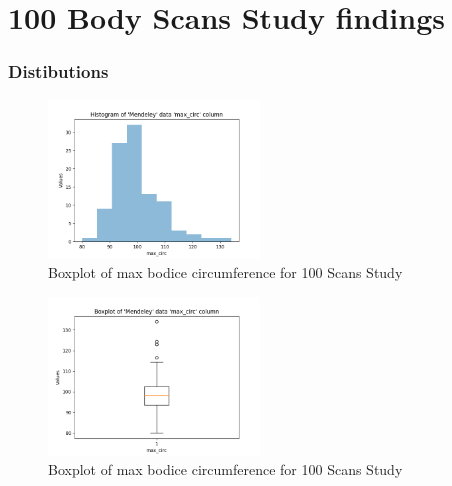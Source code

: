 \section{100 Body Scans Study findings}
\subsubsection{Distibutions}
\begin{figure} [H] %
    \centering %
    \includegraphics[width = 0.5\textwidth]{Images/Mendeley_max_circ_Hist.png} %
    \caption{Boxplot of max bodice circumference for 100 Scans Study}
    \label{} %
\end{figure}
\begin{figure} [H] %
    \centering %
    \includegraphics[width = 0.5\textwidth]{Images/Mendeley_max_circ_Boxplot.png} %
    \caption{Boxplot of max bodice circumference for 100 Scans Study}
    \label{} %
\end{figure}

